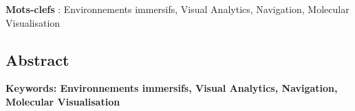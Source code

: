 \textbf{Mots-clefs} : Environnements immersifs, Visual Analytics, Navigation, Molecular Visualisation


\begin{otherlanguage}{english}

%
  
\subsection*{Abstract}
  
\footnotesize

\textbf{Keywords: Environnements immersifs, Visual Analytics, Navigation, Molecular Visualisation} 

\end{otherlanguage} 